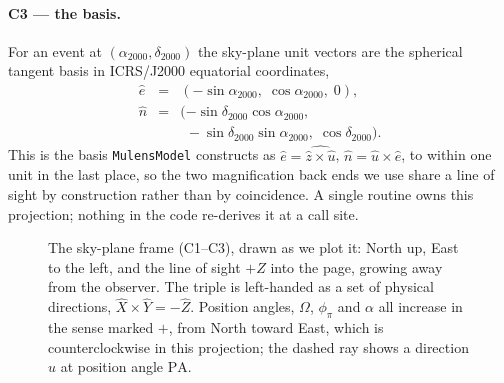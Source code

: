 \paragraph{C3 --- the basis.}  For an event at $(\alpha_{2000},
\delta_{2000})$ the sky-plane unit vectors are the spherical tangent basis
in ICRS/J2000 equatorial coordinates,
\begin{eqnarray}
  \hat{e} &=& (-\sin\alpha_{2000},\; \cos\alpha_{2000},\; 0), \\
  \hat{n} &=& (-\sin\delta_{2000}\cos\alpha_{2000}, \nonumber \\
          & & \phantom{(}
               -\sin\delta_{2000}\sin\alpha_{2000},\;
                \cos\delta_{2000}).
\end{eqnarray}
This is the basis \texttt{MulensModel} \citep{Poleski:2019} constructs as
$\hat{e} = \widehat{\hat{z}\times\hat{u}}$, $\hat{n} = \hat{u}\times\hat{e}$,
to within one unit in the last place, so the two magnification back ends we
use share a line of sight by construction rather than by coincidence.  A
single routine owns this projection; nothing in the code re-derives it at a
call site.

\begin{figure}
\centering
\caption{The sky-plane frame (C1--C3), drawn as we plot it: North up, East
to the left, and the line of sight $+Z$ into the page, growing away from
the observer.  The triple is left-handed as a set of physical directions,
$\hat{X}\times\hat{Y} = -\hat{Z}$.  Position angles, $\Omega$, $\phi_\pi$
and $\alpha$ all increase in the sense marked $+$, from North toward East,
which is counterclockwise in this projection; the dashed ray shows a
direction $\hat{u}$ at position angle $\mathrm{PA}$.}
\label{fig:skyframe}
\end{figure}

